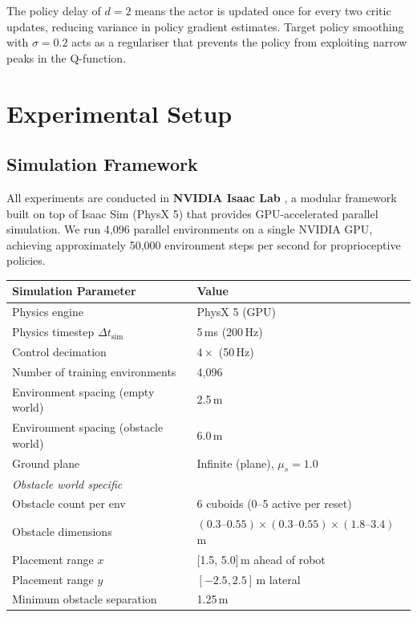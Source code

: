 \documentclass{article}
\begin{document}
The policy delay of $d=2$ means the actor is updated once for every two
critic updates, reducing variance in policy gradient estimates.
Target policy smoothing with $\sigma=0.2$ acts as a regulariser that prevents
the policy from exploiting narrow peaks in the Q-function.

\section{Experimental Setup}

\subsection{Simulation Framework}

All experiments are conducted in \textbf{NVIDIA Isaac Lab} \cite{mittal2023orbit},
a modular framework built on top of Isaac Sim (PhysX 5) that provides
GPU-accelerated parallel simulation.
We run 4{,}096 parallel environments on a single NVIDIA GPU, achieving
approximately 50{,}000 environment steps per second for proprioceptive
policies.

\begin{center}
\begin{tabular}{ll}
  \toprule
  \textbf{Simulation Parameter} & \textbf{Value} \\
  \midrule
  Physics engine & PhysX 5 (GPU) \\
  Physics timestep $\Delta t_\text{sim}$ & 5\,ms (200\,Hz) \\
  Control decimation & $4\times$ (50\,Hz) \\
  Number of training environments & 4{,}096 \\
  Environment spacing (empty world) & 2.5\,m \\
  Environment spacing (obstacle world) & 6.0\,m \\
  Ground plane & Infinite (plane), $\mu_s{=}1.0$ \\
  \midrule
  \multicolumn{2}{l}{\textit{Obstacle world specific}} \\
  Obstacle count per env & 6 cuboids (0–5 active per reset) \\
  Obstacle dimensions & $(0.3\text{–}0.55) \times (0.3\text{–}0.55) \times (1.8\text{–}3.4)$\,m \\
  Placement range $x$ & [1.5, 5.0]\,m ahead of robot \\
  Placement range $y$ & $[-2.5, 2.5]$\,m lateral \\
  Minimum obstacle separation & 1.25\,m \\
  \bottomrule
\end{tabular}
\end{center}
\end{document}

